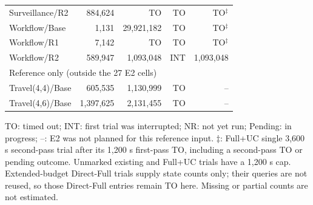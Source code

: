 \begin{table}[t]
\begin{tabular}{lrrrr}
Surveillance/R2 & 884,624 & TO & TO & TO$^{\ddagger}$ \\
Workflow/Base & 1,131 & 29,921,182 & TO & TO$^{\ddagger}$ \\
Workflow/R1 & 7,142 & TO & TO & TO$^{\ddagger}$ \\
Workflow/R2 & 589,947 & 1,093,048 & INT & 1,093,048 \\
\midrule
\multicolumn{5}{l}{Reference only (outside the 27 E2 cells)} \\
Travel(4,4)/Base & 605,535 & 1,130,999 & TO & -- \\
Travel(4,6)/Base & 1,397,625 & 2,131,455 & TO & -- \\
\bottomrule
\end{tabular}
\par\footnotesize TO: timed out; INT: first trial was interrupted; NR: not yet run; Pending: in progress; --: E2 was not planned for this reference input. $\ddagger$: Full+UC single 3,600 s second-pass trial after its 1,200 s first-pass TO, including a second-pass TO or pending outcome. Unmarked existing and Full+UC trials have a 1,200 s cap. Extended-budget Direct-Full trials supply state counts only; their queries are not reused, so those Direct-Full entries remain TO here. Missing or partial counts are not estimated.
\end{table}

